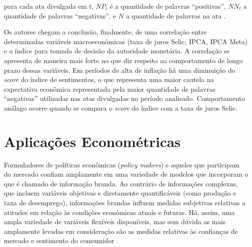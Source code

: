 \noindent
para cada ata divulgada em $t$, $NP_t$ é a quantidade de palavras ``positivas'', $NN_t$ a quantidade de palavras ``negativas'', e $N$ a quantidade de palavras na ata \cite[p.13]{costa2016ensaios}.

Os autores chegam a conclusão, finalmente, de uma correlação entre determinadas variáveis macroeconômicas (taxa de juros Selic, IPCA, IPCA Meta) e o índice para tomada de decisão da autoridade monetária. A correlação se apresenta de maneira mais forte no que diz respeito ao comportamento de longo prazo dessas variáveis. Em períodos de alta de inflação há uma diminuição do \textit{score} do índice de sentimentos, o que representa uma maior cautela na expectativa econômica representada pela maior quantidade de palavras ``negativas'' utilizadas nas atas divulgadas no período analisado. Comportamento análago ocorre quando se compara o \textit{score} do índice com a taxa de juros Selic.

\section{Aplicações Econométricas}

Formuladores de políticas econômicas (\textit{policy makers}) e aqueles que participam do mercado confiam amplamente em uma variedade de modelos que incorporam o que é chamado de informação branda. Ao contrário de informações complexas, que incluem variáveis objetivas e diretamente quantificáveis (como produção e taxa de desemprego), informações brandas influem medidas subjetivas relativas a atitudes em relação às condições econômicas atuais e futuras. Há, assim, uma ampla variedade de variáveis flexíveis disponíveis, mas sem dúvida as mais amplamente levadas em consideração  são as medidas relativas às confianças de mercado e sentimento do consumidor \cite{shapiro2018measuring}.





